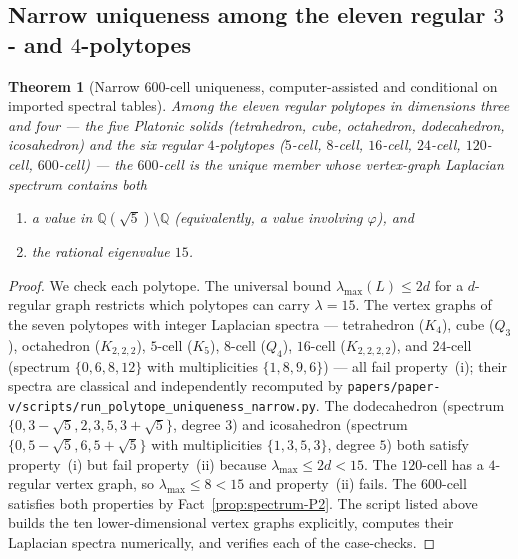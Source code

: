 \documentclass[11pt, a4paper]{amsart}
\newtheorem{theorem}{Theorem}[section]
\theoremstyle{definition}
\newcommand{\Q}{\mathbb{Q}}
\begin{document}
\subsection{Narrow uniqueness among the eleven regular $3$- and
$4$-polytopes}
\label{sec:polytope-uniqueness}

\begin{theorem}[Narrow $600$-cell uniqueness, computer-assisted
and conditional on imported spectral tables]
\label{thm:polytope-uniqueness}
Among the eleven regular polytopes in dimensions three and four
--- the five Platonic solids (tetrahedron, cube, octahedron,
dodecahedron, icosahedron) and the six regular $4$-polytopes
($5$-cell, $8$-cell, $16$-cell, $24$-cell, $120$-cell, $600$-cell)
--- the $600$-cell is the unique member whose vertex-graph
Laplacian spectrum contains both
\begin{enumerate}
\item[\textup{(i)}] a value in $\Q(\sqrt 5) \setminus \Q$
  (equivalently, a value involving $\varphi$), and
\item[\textup{(ii)}] the rational eigenvalue $15$.
\end{enumerate}
\end{theorem}

\begin{proof}
We check each polytope. The universal bound
$\lambda_{\max}(L) \leq 2d$ for a $d$-regular graph
\cite[Ch.~13]{GodsilRoyle2001} restricts which polytopes can carry
$\lambda = 15$. The vertex graphs of the seven polytopes with
integer Laplacian spectra --- tetrahedron ($K_4$), cube ($Q_3$),
octahedron ($K_{2,2,2}$), $5$-cell ($K_5$), $8$-cell ($Q_4$),
$16$-cell ($K_{2,2,2,2}$), and $24$-cell (spectrum
$\{0, 6, 8, 12\}$ with multiplicities $\{1, 8, 9, 6\}$) --- all
fail property~(i); their spectra are classical
\cite[Ch.~3]{BrouwerHaemers2012} and independently recomputed by
\verb|papers/paper-v/scripts/run_polytope_uniqueness_narrow.py|.
The dodecahedron (spectrum $\{0, 3 - \sqrt 5, 2, 3, 5, 3 + \sqrt
5\}$, degree $3$) and icosahedron (spectrum $\{0, 5 - \sqrt 5, 6,
5 + \sqrt 5\}$ with multiplicities $\{1, 3, 5, 3\}$, degree $5$)
both satisfy property~(i) but fail property~(ii) because
$\lambda_{\max} \leq 2d < 15$. The $120$-cell has a $4$-regular
vertex graph, so $\lambda_{\max} \leq 8 < 15$ and property~(ii)
fails. The $600$-cell satisfies both properties by
Fact~\ref{prop:spectrum-P2}. The script listed above
builds the ten lower-dimensional vertex graphs explicitly,
computes their Laplacian spectra numerically, and
verifies each of the case-checks.
\end{proof}
\end{document}
